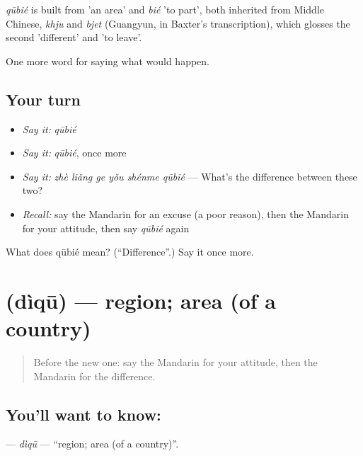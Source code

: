 \begin{cousinweb}
\emph{qūbié} is built from  'an area' and \emph{bié} 'to part', both inherited from Middle Chinese, \emph{khju} and \emph{bjet} (Guangyun, in Baxter's transcription), which glosses the second 'different' and 'to leave'.
\end{cousinweb}

\begin{grammarlens}[title={What you've built}]
One more word for saying what would happen.
\end{grammarlens}

\subsection*{Your turn}
\begin{itemize}
\raggedright
  \item \emph{Say it:} \emph{qūbié}
  \item \emph{Say it:} \emph{qūbié}, once more
  \item \emph{Say it:} \emph{zhè liǎng ge yǒu shénme qūbié} — What's the difference between these two?
  \item \emph{Recall:} say the Mandarin for an excuse (a poor reason), then the Mandarin for your attitude, then say \emph{qūbié} again
\end{itemize}

\begin{tcolorbox}[breakable,colback=teal!4,colframe=teal!35!black,title={Before you move on}]
What does qūbié mean? (\textquotedblleft{}Difference\textquotedblright{}.) Say it once more.
\end{tcolorbox}
\section[\texorpdfstring{\zh{地区} (dìqū)}{地区 (dìqū)}]{ (dìqū) — region; area (of a country)}

\label{lesson:ZH-C398-diqu}



\begin{quote}
Before the new one: say the Mandarin for your attitude, then the Mandarin for the difference.
\end{quote}

\subsection*{You'll want to know: }
\textbf{} — \emph{dìqū} — \textquotedblleft{}region; area (of a country)\textquotedblright{}.

